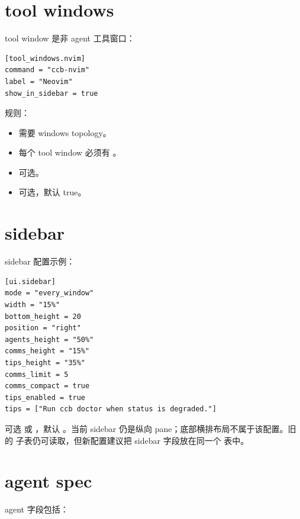\section{tool windows}

tool window 是非 agent 工具窗口：

\begin{lstlisting}
[tool_windows.nvim]
command = "ccb-nvim"
label = "Neovim"
show_in_sidebar = true
\end{lstlisting}

规则：

\begin{itemize}
  \item {} 需要 windows topology。
  \item 每个 tool window 必须有 。
  \item {} 可选。
  \item {} 可选，默认 true。
\end{itemize}

\section{sidebar}

sidebar 配置示例：

\begin{lstlisting}
[ui.sidebar]
mode = "every_window"
width = "15%"
bottom_height = 20
position = "right"
agents_height = "50%"
comms_height = "15%"
tips_height = "35%"
comms_limit = 5
comms_compact = true
tips_enabled = true
tips = ["Run ccb doctor when status is degraded."]
\end{lstlisting}

 可选  或 ，默认 。当前 sidebar 仍是纵向 pane；底部横排布局不属于该配置。旧的  子表仍可读取，但新配置建议把 sidebar 字段放在同一个  表中。

\section{agent spec}

agent 字段包括：


